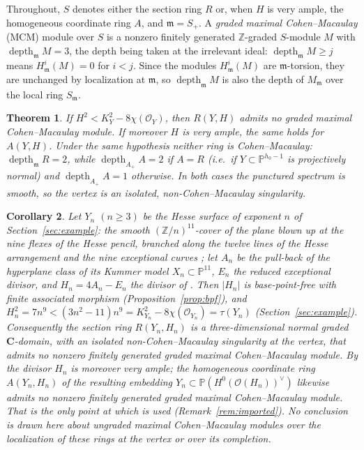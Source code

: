 \documentclass[11pt]{amsart}
\newtheorem{theorem}{Theorem}[section]
\newtheorem{corollary}[theorem]{Corollary}
\theoremstyle{remark}
\theoremstyle{definition}
\newcommand{\PP}{\mathbb{P}}
\newcommand{\ZZ}{\mathbb{Z}}
\newcommand{\CC}{\mathbf{C}}
\newcommand{\cO}{\mathcal{O}}
\DeclareMathOperator{\depth}{depth}
\begin{document}
Throughout, $S$ denotes either the section ring $R$ or, when $H$ is very ample, the homogeneous coordinate ring $A$, and $\mathfrak m=S_+$. A \emph{graded maximal Cohen--Macaulay} (MCM) module over $S$ is a nonzero finitely generated $\ZZ$-graded $S$-module $M$ with $\depth_{\mathfrak m}M=3$, the depth being taken at the irrelevant ideal: $\depth_{\mathfrak m}M\ge j$ means $H^i_{\mathfrak m}(M)=0$ for $i<j$. Since the modules $H^i_{\mathfrak m}(M)$ are $\mathfrak m$-torsion, they are unchanged by localization at $\mathfrak m$, so $\depth_{\mathfrak m}M$ is also the depth of $M_{\mathfrak m}$ over the local ring $S_{\mathfrak m}$.

\begin{theorem}\label{thm:B}
If $H^2<K_Y^2-8\chi(\cO_Y)$, then $R(Y,H)$ admits no graded maximal Cohen--Macaulay module. If moreover $H$ is very ample, the same holds for $A(Y,H)$. Under the same hypothesis neither ring is Cohen--Macaulay: $\depth_{\mathfrak m}R=2$, while $\depth_{A_+}A=2$ if $A=R$ (i.e.\ if $Y\subset\PP^{h_0-1}$ is projectively normal) and $\depth_{A_+}A=1$ otherwise. In both cases the punctured spectrum is smooth, so the vertex is an isolated, non-Cohen--Macaulay singularity.
\end{theorem}

\begin{corollary}\label{cor:C}
Let $Y_n$ $(n\ge3)$ be the Hesse surface of exponent $n$ of Section~\ref{sec:example}: the smooth $(\ZZ/n)^{11}$-cover of the plane blown up at the nine flexes of the Hesse pencil, branched along the twelve lines of the Hesse arrangement and the nine exceptional curves \cite{Hi,BHH}; let $A_n$ be the pull-back of the hyperplane class of its Kummer model $X_n\subset\PP^{11}$, $E_n$ the reduced exceptional divisor, and $H_n=4A_n-E_n$ the divisor of \cite[Thm.~1.2]{An}. Then $|H_n|$ is base-point-free with finite associated morphism (Proposition~\ref{prop:bpf}), and $H_n^2=7n^9<(3n^2-11)n^9=K_{Y_n}^2-8\chi(\cO_{Y_n})=\tau(Y_n)$ (Section~\ref{sec:example}). Consequently the section ring $R(Y_n,H_n)$ is a three-dimensional normal graded $\CC$-domain, with an isolated non-Cohen--Macaulay singularity at the vertex, that admits no nonzero finitely generated graded maximal Cohen--Macaulay module. By \cite[Thm.~1.2]{An} the divisor $H_n$ is moreover very ample; the homogeneous coordinate ring $A(Y_n,H_n)$ of the resulting embedding $Y_n\subset\PP(H^0(\cO(H_n))^\vee)$ likewise admits no nonzero finitely generated graded maximal Cohen--Macaulay module. That is the only point at which \cite{An} is used (Remark~\ref{rem:imported}). No conclusion is drawn here about ungraded maximal Cohen--Macaulay modules over the localization of these rings at the vertex or over its completion.
\end{corollary}
\end{document}
